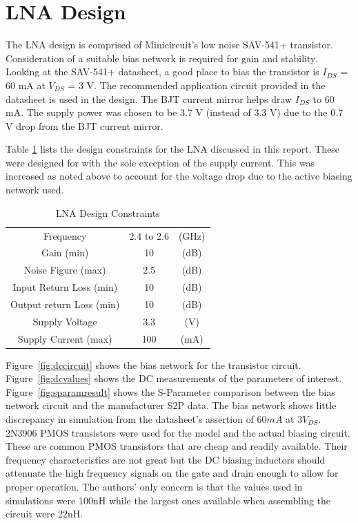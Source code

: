 \documentclass[conference]{IEEEtran}
\begin{document}
\section{LNA Design}
The LNA design is comprised of Minicircuit's low noise SAV-541+ transistor. Consideration of a suitable bias network is required for gain and stability. Looking at the SAV-541+ datasheet\cite{sav541datasheet}, a good place to bias the transistor is $I_{DS}$ = 60 mA at $V_{DS}$ = 3 V. The recommended application circuit provided in the datasheet is used in the design. The BJT current mirror helps draw $I_{DS}$ to 60 mA. The supply power was chosen to be 3.7 V (instead of 3.3 V) due to the 0.7 V drop from the BJT current mirror.

Table \ref{tab:specs} lists the design constraints for the LNA discussed in this report. These were designed for with the sole exception of the supply current. This was increased as noted above to account for the voltage drop due to the active biasing network used. 

\begin{table}[!b]
\caption{LNA Design Constraints}
\centering
\begin{tabular}{c c c}
Frequency & 2.4 to 2.6 & (GHz)\\
Gain (min) & 10 & (dB)\\
Noise Figure (max) & 2.5 & (dB)\\
Input Return Loss (min) & 10 & (dB)\\
Output return Loss (min) & 10 & (dB)\\
Supply Voltage & 3.3 & (V)\\
Supply Current (max) & 100 & (mA)\\
\end{tabular}
\label{tab:specs}
\end{table}

Figure~\ref{fig:dccircuit} shows the bias network for the transistor circuit. Figure~\ref{fig:dcvalues} shows the DC measurements of the parameters of interest. Figure~\ref{fig:sparamresult} shows the S-Parameter comparison between the bias network circuit and the manufacturer S2P data. The bias network shows little discrepancy in simulation from the datasheet's assertion of $60mA$ at $3V_{DS}$. 2N3906 PMOS transistors were used for the model and the actual biasing circuit. These are common PMOS transistors that are cheap and readily available. Their frequency characteristics are not great but the DC biasing inductors should attenuate the high frequency signals on the gate and drain enough to allow for proper operation. The authors' only concern is that the values used in simulations were 100nH while the largest ones available when assembling the circuit were 22nH. 
\end{document}
